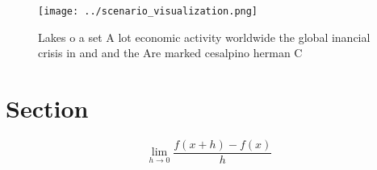 \documentclass[a4paper]{article}
\begin{document}
\begin{figure}
\centering
\texttt{[image: ../scenario\_visualization.png]}
\caption{Lakes o a set A lot economic activity worldwide the global inancial crisis in and and the Are marked cesalpino herman C
}
\end{figure}
 
\section{Section}

\[\lim_{h \rightarrow 0 } \frac{f(x+h)-f(x)}{h}\]
\end{document}
